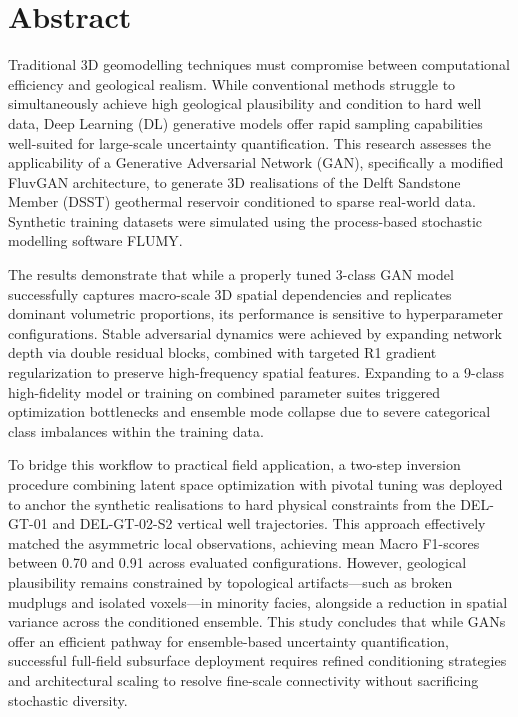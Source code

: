 \chapter*{Abstract}
Traditional 3D geomodelling techniques must compromise between computational efficiency and geological realism. While conventional methods struggle to simultaneously achieve high geological plausibility and condition to hard well data, Deep Learning (DL) generative models offer rapid sampling capabilities well-suited for large-scale uncertainty quantification. This research assesses the applicability of a Generative Adversarial Network (GAN), specifically a modified FluvGAN architecture, to generate 3D realisations of the Delft Sandstone Member (DSST) geothermal reservoir conditioned to sparse real-world data. Synthetic training datasets were simulated using the process-based stochastic modelling software FLUMY. 

The results demonstrate that while a properly tuned 3-class GAN model successfully captures macro-scale 3D spatial dependencies and replicates dominant volumetric proportions, its performance is sensitive to hyperparameter configurations. Stable adversarial dynamics were achieved by expanding network depth via double residual blocks, combined with targeted R1 gradient regularization to preserve high-frequency spatial features. Expanding to a 9-class high-fidelity model or training on combined parameter suites triggered optimization bottlenecks and ensemble mode collapse due to severe categorical class imbalances within the training data. 

To bridge this workflow to practical field application, a two-step inversion procedure combining latent space optimization with pivotal tuning was deployed to anchor the synthetic realisations to hard physical constraints from the DEL-GT-01 and DEL-GT-02-S2 vertical well trajectories. This approach effectively matched the asymmetric local observations, achieving mean Macro F1-scores between 0.70 and 0.91 across evaluated configurations. However, geological plausibility remains constrained by topological artifacts—such as broken mudplugs and isolated voxels—in minority facies, alongside a reduction in spatial variance across the conditioned ensemble. This study concludes that while GANs offer an efficient pathway for ensemble-based uncertainty quantification, successful full-field subsurface deployment requires refined conditioning strategies and architectural scaling to resolve fine-scale connectivity without sacrificing stochastic diversity.